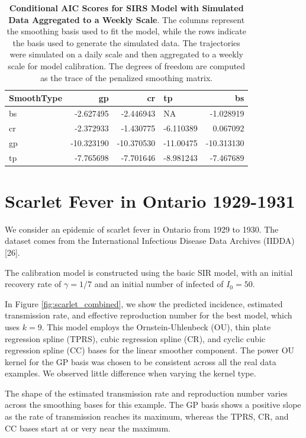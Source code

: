 \documentclass[
11pt, %
oneside, %
english, %
singlespacing, %
]{macthesis} %
\begin{document}
\begin{table}[!h]
\centering
\caption{\label{tab:aic-table-sim-agg}\textbf{Conditional AIC Scores for SIRS Model with Simulated Data Aggregated to a Weekly Scale}. The columns represent the smoothing basis used to fit the model, while the rows indicate the basis used to generate the simulated data. The trajectories were simulated on a daily scale and then aggregated to a weekly scale for model calibration. The degrees of freedom are computed as the trace of the penalized smoothing matrix.}
\centering
\begin{tabular}[t]{lrrlr}
\toprule
SmoothType & gp & cr & tp & bs\\
\midrule
bs & -2.627495 & -2.446943 & NA & -1.028919\\
cr & -2.372933 & -1.430775 & -6.110389 & 0.067092\\
gp & -10.323190 & -10.370530 & -11.00475 & -10.313130\\
tp & -7.765698 & -7.701646 & -8.981243 & -7.467689\\
\bottomrule
\end{tabular}
\end{table}

\section{Scarlet Fever in Ontario 1929-1931}\label{scarlet}

We consider an epidemic of scarlet fever in Ontario from 1929 to 1930. The dataset comes from the International Infectious Disease Data Archives (IIDDA) {[}26{]}.

The calibration model is constructed using the basic SIR model, with an initial recovery rate of \(\gamma = 1/7\) and an initial number of infected of \(I_0 = 50\).

In Figure \ref{fig:scarlet_combined}, we show the predicted incidence, estimated transmission rate, and effective reproduction number for the best model, which uses \(k = 9\). This model employs the Ornstein-Uhlenbeck (OU), thin plate regression spline (TPRS), cubic regression spline (CR), and cyclic cubic regression spline (CC) bases for the linear smoother component. The power OU kernel for the GP basis was chosen to be consistent across all the real data examples. We observed little difference when varying the kernel type.

The shape of the estimated transmission rate and reproduction number varies across the smoothing bases for this example. The GP basis shows a positive slope as the rate of transmission reaches its maximum, whereas the TPRS, CR, and CC bases start at or very near the maximum.
\end{document}
